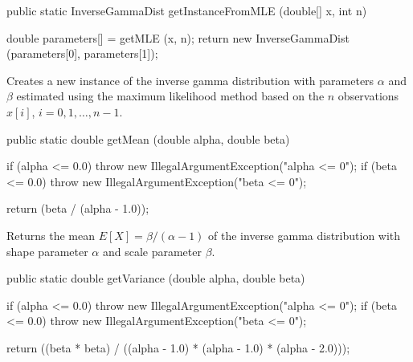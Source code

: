 \begin{htmlonly}
\end{htmlonly}
\begin{code}

   public static InverseGammaDist getInstanceFromMLE (double[] x, int n)\begin{hide} {
      double parameters[] = getMLE (x, n);
      return new InverseGammaDist (parameters[0], parameters[1]);
   }\end{hide}
\end{code}
\begin{tabb}
Creates a new instance of the inverse gamma  distribution with parameters $\alpha$
and $\beta$ estimated using the maximum likelihood method based on the $n$
observations $x[i]$, $i = 0, 1, \ldots, n-1$.
\end{tabb}
\begin{htmlonly}
\end{htmlonly}
\begin{code}

   public static double getMean (double alpha, double beta)\begin{hide} {
      if (alpha <= 0.0)
         throw new IllegalArgumentException("alpha <= 0");
      if (beta <= 0.0)
         throw new IllegalArgumentException("beta <= 0");

      return (beta / (alpha - 1.0));
   }\end{hide}
\end{code}
\begin{tabb}
   Returns the mean $E[X] = \beta / (\alpha - 1)$ of the inverse gamma
   distribution with shape parameter $\alpha$ and scale parameter $\beta$.
\end{tabb}
\begin{code}

   public static double getVariance (double alpha, double beta)\begin{hide} {
      if (alpha <= 0.0)
         throw new IllegalArgumentException("alpha <= 0");
      if (beta <= 0.0)
         throw new IllegalArgumentException("beta <= 0");

      return ((beta * beta) / ((alpha - 1.0) * (alpha - 1.0) * (alpha - 2.0)));
   }\end{hide}
\end{code}
